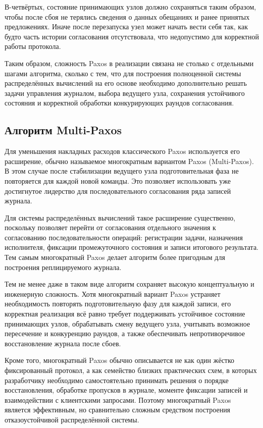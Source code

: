 В-четвёртых, состояние принимающих узлов должно сохраняться таким образом,
чтобы после сбоя не терялись сведения о данных обещаниях и ранее принятых
предложениях. Иначе после перезапуска узел может начать вести себя так, как
будто часть истории согласования отсутствовала, что недопустимо для корректной
работы протокола.

Таким образом, сложность Paxos в реализации связана не столько с отдельными
шагами алгоритма, сколько с тем, что для построения полноценной системы
распределённых вычислений на его основе необходимо дополнительно решать задачи
управления журналом, выбора ведущего узла, сохранения устойчивого состояния и
корректной обработки конкурирующих раундов согласования.

\subsection{Алгоритм Multi-Paxos}

Для уменьшения накладных расходов классического Paxos используется его
расширение, обычно называемое многократным вариантом Paxos (Multi-Paxos). В
этом случае после стабилизации ведущего узла подготовительная фаза не
повторяется для каждой новой команды. Это позволяет использовать уже
достигнутое лидерство для последовательного согласования ряда записей журнала.

Для системы распределённых вычислений такое расширение существенно, поскольку
позволяет перейти от согласования отдельного значения к согласованию
последовательности операций: регистрации задачи, назначения исполнителя,
фиксации промежуточного состояния и записи итогового результата. Тем самым
многократный Paxos делает алгоритм более пригодным для построения
реплицируемого журнала.

Тем не менее даже в таком виде алгоритм сохраняет высокую концептуальную и
инженерную сложность. Хотя многократный вариант Paxos устраняет необходимость
повторять подготовительную фазу для каждой записи, его корректная реализация
всё равно требует поддерживать устойчивое состояние принимающих узлов,
обрабатывать смену ведущего узла, учитывать возможное пересечение и конкуренцию
раундов, а также обеспечивать непротиворечивое восстановление журнала после
сбоев.

Кроме того, многократный Paxos обычно описывается не как один жёстко
фиксированный протокол, а как семейство близких практических схем, в которых
разработчику необходимо самостоятельно принимать решения о порядке
восстановления, обработке пропусков в журнале, моменте фиксации записей и
взаимодействии с клиентскими запросами. Поэтому многократный Paxos является
эффективным, но сравнительно сложным средством построения отказоустойчивой
распределённой системы.

